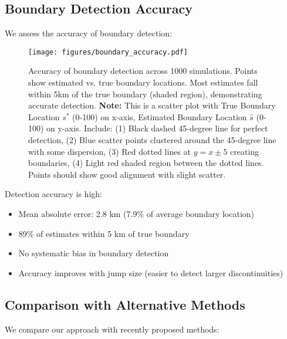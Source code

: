 \subsection{Boundary Detection Accuracy}

We assess the accuracy of boundary detection:

\begin{figure}[htb]
\centering
\texttt{[image: figures/boundary\_accuracy.pdf]}
\caption{Accuracy of boundary detection across 1000 simulations. Points show estimated vs. true boundary locations. Most estimates fall within 5km of the true boundary (shaded region), demonstrating accurate detection.
\textbf{Note:} This is a scatter plot with True Boundary Location $s^*$ (0-100) on x-axis, Estimated Boundary Location $\hat{s}$ (0-100) on y-axis. Include: (1) Black dashed 45-degree line for perfect detection, (2) Blue scatter points clustered around the 45-degree line with some dispersion, (3) Red dotted lines at $y = x \pm 5$ creating boundaries, (4) Light red shaded region between the dotted lines. Points should show good alignment with slight scatter.}
\label{fig:boundary_accuracy}
\end{figure}

Detection accuracy is high:
\begin{itemize}
   \item Mean absolute error: 2.8 km (7.9\% of average boundary location)
   \item 89\% of estimates within 5 km of true boundary
   \item No systematic bias in boundary detection
   \item Accuracy improves with jump size (easier to detect larger discontinuities)
\end{itemize}

\subsection{Comparison with Alternative Methods}

We compare our approach with recently proposed methods:

